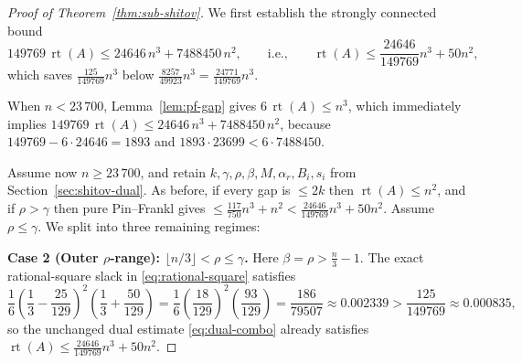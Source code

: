 \documentclass[11pt]{article}
\theoremstyle{definition}
\theoremstyle{remark}
\newcommand{\rt}{\operatorname{rt}}
\begin{document}
\begin{proof}[Proof of Theorem~\ref{thm:sub-shitov}]
We first establish the strongly connected bound
\[
  149769\, \rt(A) \le 24646\, n^3 + 7488450\, n^2,
  \qquad\text{i.e.,}\qquad
  \rt(A) \le \frac{24646}{149769} n^3 + 50 n^2,
\]
which saves $\frac{125}{149769} n^3$ below $\frac{8257}{49923} n^3 = \frac{24771}{149769} n^3$.

When $n < 23\,700$, Lemma~\ref{lem:pf-gap} gives $6\, \rt(A) \le n^3$, which immediately implies $149769\, \rt(A) \le 24646\, n^3 + 7488450\, n^2$, because $149769 - 6 \cdot 24646 = 1893$ and $1893 \cdot 23699 < 6 \cdot 7488450$.

Assume now $n \ge 23\,700$, and retain $k, \gamma, \rho, \beta, M, \alpha_r, B_i, s_i$ from Section~\ref{sec:shitov-dual}. As before, if every gap is $\le 2k$ then $\rt(A) \le n^2$, and if $\rho > \gamma$ then pure Pin--Frankl gives $\le \frac{117}{750} n^3 + n^2 < \frac{24646}{149769} n^3 + 50 n^2$. Assume $\rho \le \gamma$. We split into three remaining regimes:

\smallskip
\noindent\textbf{Case 2 (Outer $\rho$-range): $\lfloor n/3 \rfloor < \rho \le \gamma$.}
Here $\beta = \rho > \frac{n}{3} - 1$. The exact rational-square slack in \eqref{eq:rational-square} satisfies
\[
  \frac{1}{6}\left(\frac{1}{3} - \frac{25}{129}\right)^2 \left(\frac{1}{3} + \frac{50}{129}\right)
  = \frac{1}{6}\left(\frac{18}{129}\right)^2 \left(\frac{93}{129}\right)
  = \frac{186}{79507} \approx 0.002339 > \frac{125}{149769} \approx 0.000835,
\]
so the unchanged dual estimate \eqref{eq:dual-combo} already satisfies $\rt(A) \le \frac{24646}{149769} n^3 + 50 n^2$.


\end{proof}
\end{document}
